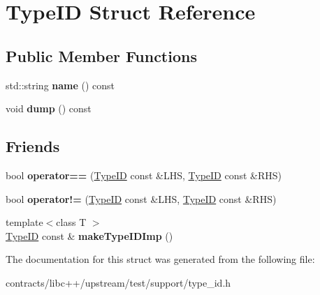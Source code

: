 \hypertarget{struct_type_i_d}{}\section{Type\+ID Struct Reference}
\label{struct_type_i_d}
\subsection*{Public Member Functions}
\begin{DoxyCompactItemize}
\item 
\mbox{\label{struct_type_i_d_a2125d28029895304d649db73e859d3a3}} 
std\+::string {\bfseries name} () const
\item 
\mbox{\label{struct_type_i_d_ae11946f7704e30e0a53908cf3176a465}} 
void {\bfseries dump} () const
\end{DoxyCompactItemize}
\subsection*{Friends}
\begin{DoxyCompactItemize}
\item 
\mbox{\label{struct_type_i_d_ad9f878594c68ffc553b8cf0346a68054}} 
bool {\bfseries operator==} (\mbox{\hyperlink{struct_type_i_d}{Type\+ID}} const \&L\+HS, \mbox{\hyperlink{struct_type_i_d}{Type\+ID}} const \&R\+HS)
\item 
\mbox{\label{struct_type_i_d_af6dbea093ed54a9e1a199ed4fe004399}} 
bool {\bfseries operator!=} (\mbox{\hyperlink{struct_type_i_d}{Type\+ID}} const \&L\+HS, \mbox{\hyperlink{struct_type_i_d}{Type\+ID}} const \&R\+HS)
\item 
\mbox{\label{struct_type_i_d_a052a3974cee2a38f0ae67b0a7b0b59bc}} 
{\footnotesize template$<$class T $>$ }\\\mbox{\hyperlink{struct_type_i_d}{Type\+ID}} const  \& {\bfseries make\+Type\+I\+D\+Imp} ()
\end{DoxyCompactItemize}


The documentation for this struct was generated from the following file\+:\begin{DoxyCompactItemize}
\item 
contracts/libc++/upstream/test/support/type\+\_\+id.\+h\end{DoxyCompactItemize}
